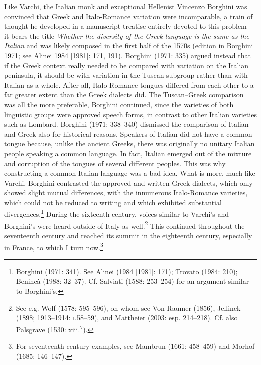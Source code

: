 \begin{styleStandard}
Like Varchi, the Italian monk and exceptional Hellenist Vincenzo Borghini was convinced that Greek and Italo-Romance variation were incomparable, a train of thought he developed in a manuscript treatise entirely devoted to this problem – it bears the title \textit{Whether the diversity of the Greek language is the same as the Italian} and was likely composed in the first half of the 1570s (edition in Borghini 1971; see Alinei 1984 [1981]: 171, 191). Borghini (1971: 335) argued instead that if the Greek context really needed to be compared with variation on the Italian peninsula, it should be with variation in the Tuscan subgroup rather than with Italian as a whole. After all, Italo-Romance tongues differed from each other to a far greater extent than the Greek dialects did. The Tuscan–Greek comparison was all the more preferable, Borghini continued, since the varieties of both linguistic groups were approved speech forms, in contrast to other Italian varieties such as Lombard. Borghini (1971: 338–340) dismissed the comparison of Italian and Greek also for historical reasons. Speakers of Italian did not have a common tongue because, unlike the ancient Greeks, there was originally no unitary Italian people speaking a common language. In fact, Italian emerged out of the mixture and corruption of the tongues of several different peoples. This was why constructing a common Italian language was a bad idea. What is more, much like Varchi, Borghini contrasted the approved and written Greek dialects, which only showed slight mutual differences, with the innumerous Italo-Romance varieties, which could not be reduced to writing and which exhibited substantial divergences.\footnote{ Borghini (1971: 341). See Alinei (1984 [1981]: 171); Trovato (1984: 210); Benincà (1988: 32–37). Cf. Salviati (1588: 253–254) for an argument similar to Borghini’s.} During the sixteenth century, voices similar to Varchi’s and Borghini’s were heard outside of Italy as well.\footnote{ See e.g. Wolf (1578: 595–596), on whom see Von Raumer (1856), Jellinek (1898; 1913–1914: \textsc{i}.58–59), and Mattheier (2003: esp. 214–218). Cf. also Palsgrave (1530: xiii.\textsc{\textsuperscript{v}}).} This continued throughout the seventeenth century and reached its summit in the eighteenth century, especially in France, to which I turn now.\footnote{ For seventeenth-century examples, see Mambrun (1661: 458–459) and Morhof (1685: 146–147).}
\end{styleStandard}

